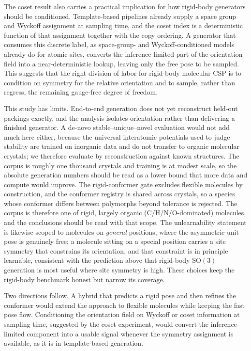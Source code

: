 \documentclass[11pt]{article}
\begin{document}
The coset result also carries a practical implication for how rigid-body
generators should be conditioned. Template-based pipelines already supply a
space group and Wyckoff assignment at sampling time, and the coset index is a
deterministic function of that assignment together with the copy ordering. A
generator that consumes this discrete label, as space-group- and
Wyckoff-conditioned models already do for atomic
sites\cite{jiao2024diffcsppp,wyckoffdiff2025,symmcd2025}, converts the
inference-limited part of the orientation field into a near-deterministic
lookup, leaving only the free pose to be sampled. This suggests that
the right division of labor for rigid-body molecular CSP is to condition on
symmetry for the relative orientation and to sample, rather than regress, the
remaining gauge-free degree of freedom.

This study has limits. End-to-end generation does not yet reconstruct held-out
packings exactly, and the analysis isolates orientation rather than delivering a
finished generator. A de-novo stable--unique--novel evaluation would not add much
here either, because the universal interatomic potentials used to judge stability
are trained on inorganic data\cite{deng2023chgnet} and do not transfer to organic
molecular crystals; we therefore evaluate by reconstruction against known
structures. The corpus is roughly one thousand crystals and training is at modest
scale, so the absolute generation numbers should be read as a lower bound that
more data and compute would improve. The rigid-conformer gate excludes flexible
molecules by construction, and the conformer registry is shared across crystals,
so a species whose conformer differs between polymorphs beyond tolerance is
rejected. The corpus is therefore one of rigid, largely organic
(C/H/N/O-dominated) molecules, and the conclusions should be read with that
scope. The unlearnability statement is likewise scoped to molecules on
\emph{general} positions, where the asymmetric-unit pose is genuinely free; a
molecule sitting on a special position carries a site symmetry that constrains
its orientation, and that constraint is in principle learnable, consistent with
the prediction above that rigid-body $\mathrm{SO}(3)$ generation is most useful
where site symmetry is high. These choices keep the rigid-body benchmark honest
but narrow its coverage.

Two directions follow. A hybrid that predicts a rigid pose and then refines the
conformer would extend the approach to flexible molecules while keeping the
fast pose flow. Conditioning the orientation field on Wyckoff or coset
information at sampling time, suggested by the coset experiment, would convert
the inference-limited component into a usable signal whenever the symmetry
assignment is available, as it is in template-based generation.
\end{document}
